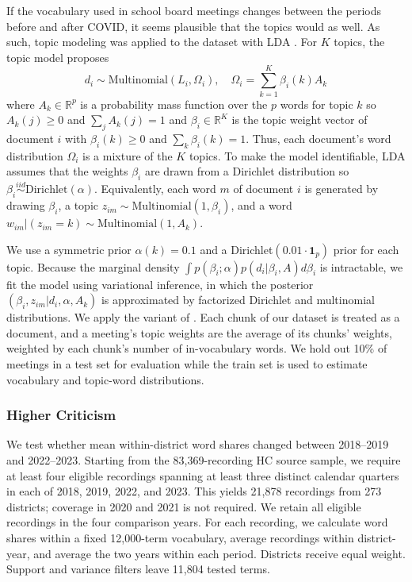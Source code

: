 \documentclass[12pt]{article}
\begin{document}
If the vocabulary used in school board meetings changes between the periods before and after COVID, it seems plausible that the topics would as well. As such, topic modeling was applied to the dataset with LDA \citep{blei_latent_2003}. For $K$ topics, the topic model proposes
\[ d_i \sim \text{Multinomial}(L_i, \Omega_i), \quad \Omega_i = \sum_{k=1}^K \beta_i(k) A_k \]
\noindent where $A_k \in \mathbb R^p$ is a probability mass function over the $p$ words for topic $k$ so $A_k(j) \geq 0$ and $\sum_j A_k(j)=1$ and $\beta_i \in \mathbb R^K$ is the topic weight vector of document $i$ with $\beta_i(k) \geq 0$ and $\sum_k \beta_i(k)=1$. Thus, each document's word distribution $\Omega_i$ is a mixture of the $K$ topics. To make the model identifiable, LDA assumes that the weights $\beta_i$ are drawn from a Dirichlet distribution so $\beta_i \overset{iid}{\sim} \text{Dirichlet}(\alpha)$. Equivalently, each word $m$ of document $i$ is generated by drawing $\beta_i$, a topic $z_{im} \sim \text{Multinomial}(1, \beta_i)$, and a word $w_{im}|(z_{im}=k) \sim \text{Multinomial}(1, A_k)$. 

We use a symmetric prior $\alpha(k) = 0.1$ and a Dirichlet$(0.01 \cdot \mathbf 1_p)$ prior for each topic. Because the marginal density $\int p(\beta_i; \alpha) p(d_i | \beta_i, A) d\beta_i$ is intractable, we fit the model using variational inference, in which the posterior $(\beta_i, z_{im}| d_i, \alpha, A_k)$ is approximated by factorized Dirichlet and multinomial distributions. We apply the variant of \citet{hoffman2010lda}. Each chunk of our dataset is treated as a document, and a meeting's topic weights are the average of its chunks' weights, weighted by each chunk's number of in-vocabulary words. We hold out 10\% of meetings in a test set for evaluation while the train set is used to estimate vocabulary and topic-word distributions.

\subsubsection{Higher Criticism}\label{sec:m-lda} We test whether mean within-district word shares changed between
2018--2019 and 2022--2023. Starting from the 83,369-recording
HC source sample, we require at least four eligible recordings
spanning at least three distinct calendar quarters in each of
2018, 2019, 2022, and 2023. This yields 21,878 recordings from
273 districts; coverage in 2020 and 2021 is not required.
We retain all eligible recordings in the four comparison years.
For each recording, we calculate word shares within a fixed
12,000-term vocabulary, average recordings within district-year,
and average the two years within each period. Districts receive
equal weight. Support and variance filters leave 11,804 tested
terms.
\end{document}

